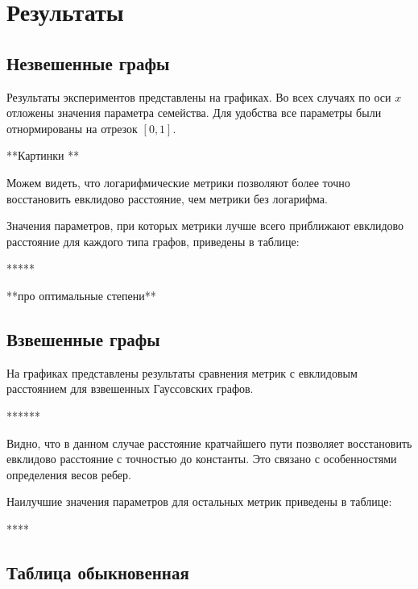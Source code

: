 \chapter{Результаты} \label{chapt3}


\section{Незвешенные графы} \label{sect3_1}

Результаты экспериментов представлены на графиках.
Во всех случаях по оси $x$ отложены значения параметра семейства. Для удобства все параметры были отнормированы на отрезок $[0,1]$.

**Картинки ** 

Можем видеть, что логарифмические метрики позволяют более точно восстановить евклидово расстояние, чем метрики без логарифма.

Значения параметров, при которых метрики лучше всего приближают евклидово расстояние для каждого типа графов, приведены в таблице:

*****

**про оптимальные степени**




\section{Взвешенные графы} \label{sect3_2}

На графиках представлены результаты сравнения метрик с евклидовым расстоянием для взвешенных Гауссовских графов.

******

Видно, что в данном случае расстояние кратчайшего пути позволяет восстановить евклидово расстояние с точностью до константы. Это связано с особенностями определения весов ребер.

Наилучшие значения параметров для остальных метрик приведены в таблице:

****





\section{Таблица обыкновенная} \label{sect3_1}


